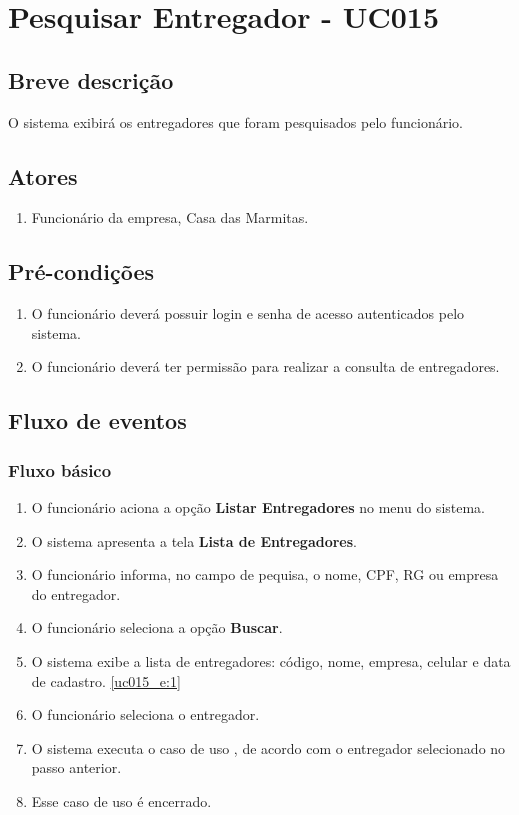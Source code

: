 \chapter{Pesquisar Entregador - UC015} \label{uc015}

\section{Breve descrição}

O sistema exibirá os entregadores que foram pesquisados pelo funcionário.

\section{Atores}

\begin{enumerate}
	\item Funcionário da empresa, Casa das Marmitas.
\end{enumerate}

\section{Pré-condições}

\begin{enumerate}
	\item O funcionário deverá possuir login e senha de acesso autenticados pelo sistema.
	\item O funcionário deverá ter permissão para realizar a consulta de entregadores.
\end{enumerate}

\section{Fluxo de eventos}

\subsection{Fluxo básico}

\begin{enumerate}[label=P\arabic*]
	\item O funcionário aciona a opção \textbf{Listar Entregadores} no menu do sistema.
	\item O sistema apresenta a tela \textbf{Lista de Entregadores}. \label{uc015_p:2}	
	\item O funcionário informa, no campo de pequisa, o nome, CPF, RG ou empresa do entregador.
	\item O funcionário seleciona a opção \textbf{Buscar}.
	\item O sistema exibe a lista de entregadores: código, nome, empresa, celular e data de cadastro. \label{uc015_p:5}\ref{uc015_e:1}
	\item O funcionário seleciona o entregador.
	\item O sistema executa o caso de uso , de acordo com o entregador selecionado no passo anterior.
	\item Esse caso de uso é encerrado.
\end{enumerate}

